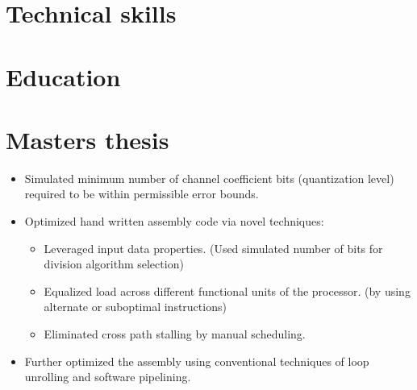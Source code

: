 \documentclass[11pt,a4paper]{moderncv}
\begin{document}
\section{Technical skills}

\section{Education}


\section{Masters thesis}
\begin{itemize}%
\item Simulated minimum number of channel coefficient bits (quantization level) required to be within permissible error bounds.
\item Optimized hand written assembly code via novel techniques:
	\begin{itemize}%
	\item Leveraged input data properties. (Used simulated number of bits for division algorithm selection)
	\item Equalized load across different functional units of the processor. (by using alternate or suboptimal instructions)
	\item Eliminated cross path stalling by manual scheduling.
	\end{itemize}
\item Further optimized the assembly using conventional techniques of loop unrolling and software pipelining.
\end{itemize}

\end{document}
